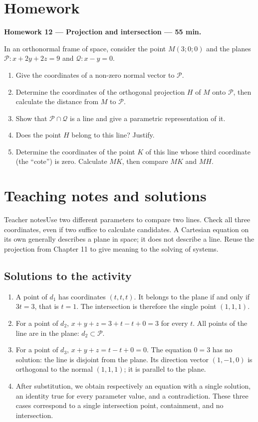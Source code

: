 \section{Homework}\textbf{Homework 12 --- Projection and intersection --- 55 min.}\par In an orthonormal frame of space, consider the point $M(3;0;0)$ and the planes $\mathcal P:x+2y+2z=9$ and $\mathcal Q:x-y=0$.
\begin{enumerate}\item Give the coordinates of a non-zero normal vector to $\mathcal P$.
\item Determine the coordinates of the orthogonal projection $H$ of $M$ onto $\mathcal P$, then calculate the distance from $M$ to $\mathcal P$.
\item Show that $\mathcal P\cap\mathcal Q$ is a line and give a parametric representation of it.
\item Does the point $H$ belong to this line? Justify.
\item Determine the coordinates of the point $K$ of this line whose third coordinate (the ``cote'') is zero. Calculate $MK$, then compare $MK$ and $MH$.\end{enumerate}

\ifprof\clearpage\section{Teaching notes and solutions}\begin{profbox}{Teacher notes}Use two different parameters to compare two lines. Check all three coordinates, even if two suffice to calculate candidates. A Cartesian equation on its own generally describes a plane in space; it does not describe a line. Reuse the projection from Chapter 11 to give meaning to the solving of systems.\end{profbox}

\subsection{Solutions to the activity}\begin{enumerate}
\item A point of $d_1$ has coordinates $(t,t,t)$. It belongs to the plane if and only if $3t=3$, that is $t=1$. The intersection is therefore the single point $(1,1,1)$.
\item For a point of $d_2$, $x+y+z=3+t-t+0=3$ for every $t$. All points of the line are in the plane: $d_2\subset\mathcal P$.
\item For a point of $d_3$, $x+y+z=t-t+0=0$. The equation $0=3$ has no solution: the line is disjoint from the plane. Its direction vector $(1,-1,0)$ is orthogonal to the normal $(1,1,1)$; it is parallel to the plane.
\item After substitution, we obtain respectively an equation with a single solution, an identity true for every parameter value, and a contradiction. These three cases correspond to a single intersection point, containment, and no intersection.
\end{enumerate}

